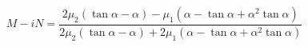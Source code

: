 \begin{equation}
    M-iN = \frac{2\mu_2(\tan\alpha - \alpha) - \mu_1(\alpha -\tan\alpha + \alpha^2\tan\alpha)}{2\mu_2(\tan\alpha - \alpha) + 2\mu_1(\alpha -\tan\alpha + \alpha^2\tan\alpha)}
\label{eq:sphere_in_alternating_magnetic_field_min}
\end{equation}
